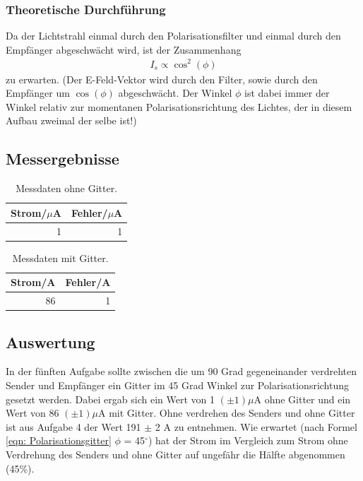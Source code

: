 \documentclass[12pt]{scrartcl}
\begin{document}
\subsubsection{Theoretische Durchführung}
Da der Lichtstrahl einmal durch den Polarisationsfilter und einmal durch den Empfänger abgeschwächt wird, ist der Zusammenhang
\begin{align}
I_s \propto \cos^2(\phi)
\label{eqn: Polarisationsgitter}
\end{align}
zu erwarten. (Der E-Feld-Vektor wird durch den Filter, sowie durch den Empfänger um $\cos(\phi)$ abgeschwächt. Der Winkel $\phi$ ist dabei immer der Winkel relativ zur momentanen Polarisationsrichtung des Lichtes, der in diesem Aufbau zweimal der selbe ist!)
\subsection{Messergebnisse}
\begin{table}[H]
\caption{Messdaten ohne Gitter.}
\centering
\begin{tabular}{|l|l|}
\hline
Strom/$\mu$A & Fehler/$\mu$A \\ \hline
\multicolumn{1}{|r|}{1} & \multicolumn{1}{r|}{1} \\ \hline
\end{tabular}
\label{tab:a_5_o}
\end{table}

\begin{table}[H]
\caption{Messdaten mit Gitter.}
\centering
\begin{tabular}{|l|l|}
\hline
Strom/A & Fehler/A \\ \hline
\multicolumn{1}{|r|}{86} & \multicolumn{1}{r|}{1} \\ \hline
\end{tabular}
\label{tab:a_5_m}
\end{table}
\subsection{Auswertung}
In der fünften Aufgabe sollte zwischen die um 90 Grad gegeneinander verdrehten Sender und Empfänger ein Gitter im 45 Grad Winkel zur Polarisationsrichtung gesetzt werden. Dabei ergab sich ein Wert von 1 $(\pm 1) \mu$A ohne Gitter und ein Wert von 86 $(\pm 1) \mu$A mit Gitter. Ohne verdrehen des Senders und ohne Gitter ist aus Aufgabe 4 der Wert 191 $\pm$ 2 A zu entnehmen. Wie erwartet (nach Formel \ref{eqn: Polarisationsgitter} $\phi$ = 45$^{\circ}$) hat der Strom im Vergleich zum Strom ohne Verdrehung des Senders und ohne Gitter auf ungefähr die Hälfte abgenommen (45\%).
\end{document}

